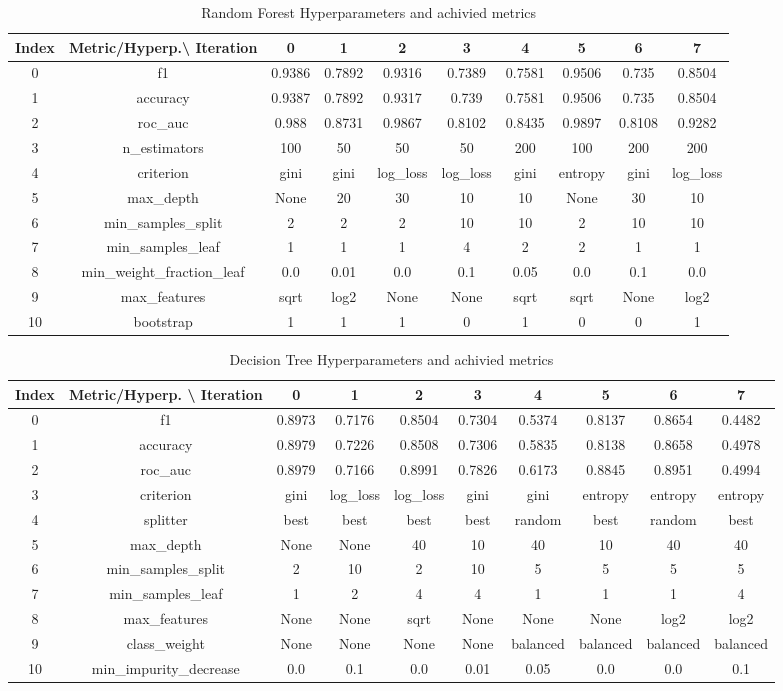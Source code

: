 \documentclass{article}%
\begin{document}
\begin{table}[h!]%
\caption{Random Forest Hyperparameters and achivied metrics}%
\vspace{0.2cm}%
\centering%
\begin{tabular}{|c||c||c||c||c||c||c||c||c||c|}%
\hline%
Index&Metric/Hyperp.\textbackslash{} Iteration&0&1&2&3&4&5&6&7\\%
\hline%
0&f1&0.9386&0.7892&0.9316&0.7389&0.7581&0.9506&0.735&0.8504\\%
1&accuracy&0.9387&0.7892&0.9317&0.739&0.7581&0.9506&0.735&0.8504\\%
2&roc\_auc&0.988&0.8731&0.9867&0.8102&0.8435&0.9897&0.8108&0.9282\\%
3&n\_estimators&100&50&50&50&200&100&200&200\\%
4&criterion&gini&gini&log\_loss&log\_loss&gini&entropy&gini&log\_loss\\%
5&max\_depth&None&20&30&10&10&None&30&10\\%
6&min\_samples\_split&2&2&2&10&10&2&10&10\\%
7&min\_samples\_leaf&1&1&1&4&2&2&1&1\\%
8&min\_weight\_fraction\_leaf&0.0&0.01&0.0&0.1&0.05&0.0&0.1&0.0\\%
9&max\_features&sqrt&log2&None&None&sqrt&sqrt&None&log2\\%
10&bootstrap&1&1&1&0&1&0&0&1\\%
\hline%
\end{tabular}%
\end{table}

%


\begin{table}[h!]%
\caption{Decision Tree Hyperparameters and achivied metrics}%
\vspace{0.2cm}%
\centering%
\begin{tabular}{|c||c||c||c||c||c||c||c||c||c|}%
\hline%
Index&Metric/Hyperp. \textbackslash{} Iteration&0&1&2&3&4&5&6&7\\%
\hline%
0&f1&0.8973&0.7176&0.8504&0.7304&0.5374&0.8137&0.8654&0.4482\\%
1&accuracy&0.8979&0.7226&0.8508&0.7306&0.5835&0.8138&0.8658&0.4978\\%
2&roc\_auc&0.8979&0.7166&0.8991&0.7826&0.6173&0.8845&0.8951&0.4994\\%
3&criterion&gini&log\_loss&log\_loss&gini&gini&entropy&entropy&entropy\\%
4&splitter&best&best&best&best&random&best&random&best\\%
5&max\_depth&None&None&40&10&40&10&40&40\\%
6&min\_samples\_split&2&10&2&10&5&5&5&5\\%
7&min\_samples\_leaf&1&2&4&4&1&1&1&4\\%
8&max\_features&None&None&sqrt&None&None&None&log2&log2\\%
9&class\_weight&None&None&None&None&balanced&balanced&balanced&balanced\\%
10&min\_impurity\_decrease&0.0&0.1&0.0&0.01&0.05&0.0&0.0&0.1\\%
\hline%
\end{tabular}%
\end{table}
\end{document}
